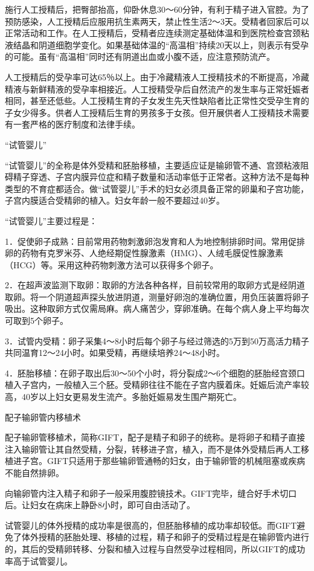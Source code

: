 \documentclass[12pt,UTF8]{ctexbook}
\begin{document}
施行人工授精后，把臀部抬高，仰卧休息30～60分钟，有利于精子进入官腔。为了预防感染，人工授精后应服用抗生素两天，禁止性生活2～3天。受精者回家后可以正常活动和工作。在人工授精后，受精者应连续测定基础体温和到医院检查宫颈粘液结晶和阴道细胞学变化。如果基础体温的“高温相”持续20天以上，则表示有受孕的可能。虽有“高温相”同时还有阴道出血或小腹不适，应注意预防流产。

人工授精后的受孕率可达65％以上。由于冷藏精液人工授精技术的不断提高，冷藏精液与新鲜精液的受孕率相接近。人工授精受孕后自然流产的发生率与正常妊娠者相同，甚至还低些。人工授精生育的子女发生先天性缺陷者比正常性交受孕生育的子女少得多。供者人工授精后生育的男孩多于女孩。但开展供者人工授精技术需要有一套严格的医疗制度和法律手续。

“试管婴儿”

“试管婴儿”的全称是体外受精和胚胎移植，主要适应证是输卵管不通、宫颈粘液阻碍精子穿透、子宫内膜异位症和精子数量和活动率低于正常者。这种方法不是每种类型的不育症都适合。做“试管婴儿”手术的妇女必须具备正常的卵巢和子宫功能，子宫内膜适合受精卵的植入。妇女年龄一般不要超过40岁。

“试管婴儿”主要过程是：

1．促使卵子成熟：目前常用药物刺激卵泡发育和人为地控制排卵时间。常用促排卵的药物有克罗米芬、人绝经期促性腺激素（HMG）、人绒毛膜促性腺激素（HCG）等。采用这种药物刺激方法可以获得多个卵子。

2．在超声波监测下取卵：取卵的方法各种各样，目前较常用的取卵方式是经阴道取卵。将一个阴道超声探头放进阴道，测量好卵泡的准确位置，用负压装置将卵子吸出。这种取卵方式仅需局麻。病人痛苦少，穿卵准确。在每个病人身上平均每次可取到5个卵子。

3．试管内受精：卵子采集4～8小时后每个卵子与经过筛选的5万到50万高活力精子共同温育12～24小时。如果受精，再继续培养24～48小时。

4．胚胎移植：在卵子取出后30～50个小时，将分裂成2～6个细胞的胚胎经宫颈口植入子宫内，一般植入三个胚。受精卵往往不能在子宫内膜着床。妊娠后流产率较高，40岁以上妇女更易发生流产。多胎妊娠易发生围产期死亡。

配子输卵管内移植术

配子输卵管移植术，简称GIFT，配子是精子和卵子的统称。是将卵子和精子直接注入输卵管让其自然受精，分裂，转移进子宫，植入，而不是体外受精后再人工移植进子宫。GIFT只适用于那些输卵管通畅的妇女，由于输卵管的机械阻塞或疾病不能自然排卵。

向输卵管内注入精子和卵子一般采用腹腔镜技术。GIFT完毕，缝合好手术切口后。让妇女在病床上静卧8小时，即可自由活动了。

试管婴儿的体外授精的成功率是很高的，但胚胎移植的成功率却较低。而GIFT避免了体外授精的胚胎处理、移植的过程，精子和卵子的受精过程是在输卵管内进行的，其后的受精卵转移、分裂和植入过程与自然受孕过程相同，所以GIFT的成功率高于试管婴儿。
\end{document}
